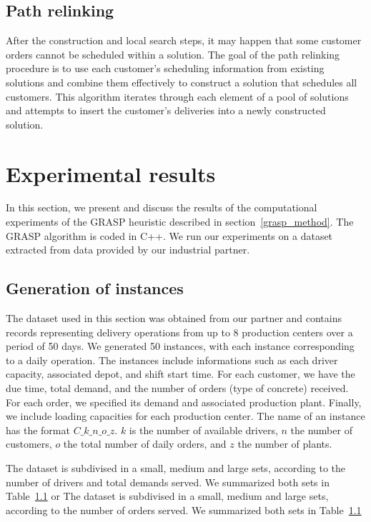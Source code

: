 \documentclass{article}
\begin{document}
\subsection{Path relinking}

After the construction and local search steps, it may happen that some customer orders cannot be scheduled within a solution. The goal of the path relinking procedure is to use each customer's scheduling information from existing solutions and combine them effectively to construct a solution that schedules all customers. This algorithm iterates through each element of a pool of solutions and attempts to insert the customer's deliveries into a newly constructed solution.

\section{ Experimental results}
\label{comp_exp}

In this section, we present and discuss the results of the computational experiments of the GRASP heuristic described in section~\ref{grasp_method}. The GRASP algorithm is coded in C++. We run our experiments on a dataset extracted from data provided by our industrial partner.

\subsection{Generation of instances}

The dataset used in this section was obtained from our partner and contains records representing delivery operations from up to 8 production centers over a period of 50 days. We generated 50 instances, with each instance corresponding to a daily operation. The instances include informations such as each driver capacity, associated depot, and shift start time. For each customer, we have the due time, total demand, and the number of orders (type of concrete) received. For each order, we specified its demand and associated production plant. Finally, we include loading capacities for each production center. 
The name of an instance has the format $C\_k\_n\_o\_z$. $k$ is the number of available drivers, $n$ the number of customers, $o$ the total number of daily orders, and $z$ the number of plants.

The dataset is subdivised in a small, medium and large sets, according to the number of drivers and total demands served. We summarized both sets in Table~\ref*{}
or 
The dataset is subdivised in a small, medium and large sets, according to the number of orders served. We summarized both sets in Table~\ref*{}
\end{document}
